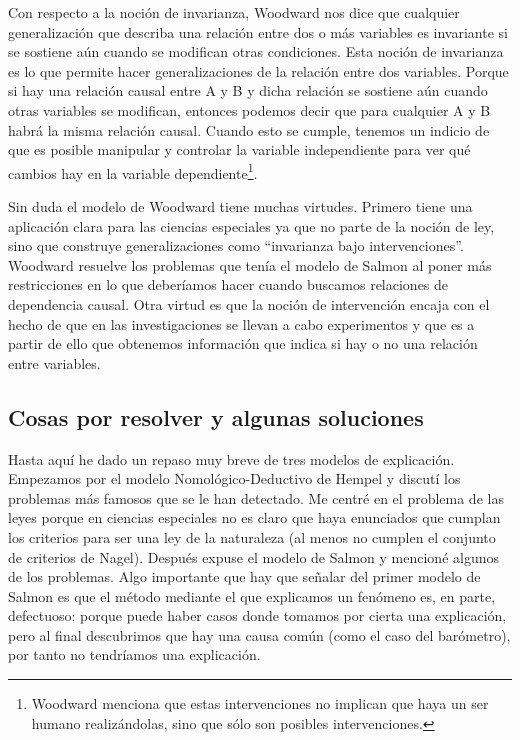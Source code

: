Con respecto a la noción de invarianza, Woodward nos dice que cualquier generalización que describa una relación entre dos o más variables es invariante si se sostiene aún cuando se modifican otras condiciones. Esta noción de invarianza es lo que permite hacer generalizaciones de la relación entre dos variables. Porque si hay una relación causal entre A y B y dicha relación se sostiene aún cuando otras variables se modifican, entonces podemos decir que para cualquier A y B habrá la misma relación causal. Cuando esto se cumple, tenemos un indicio de que es posible manipular y controlar la variable independiente para ver qué cambios hay en la variable dependiente\footnote{Woodward menciona que estas intervenciones no implican que haya un ser humano realizándolas, sino que sólo son posibles intervenciones.}\cite{Woodward2000}.

Sin duda el modelo de Woodward tiene muchas virtudes. Primero tiene una aplicación clara para las ciencias especiales ya que no parte de la noción de ley, sino que construye generalizaciones como ``invarianza bajo intervenciones''. Woodward resuelve los problemas que tenía el modelo de Salmon al poner más restricciones en lo que deberíamos hacer cuando buscamos relaciones de dependencia causal. Otra virtud es que la noción de intervención encaja con el hecho de que en las investigaciones se llevan a cabo experimentos y que es a partir de ello que obtenemos información que indica si hay o no una relación entre variables.

\subsection{Cosas por resolver y algunas soluciones}

\noindent Hasta aquí he dado un repaso muy breve de tres modelos de explicación. Empezamos por el modelo Nomológico-Deductivo de Hempel y discutí los problemas más famosos que se le han detectado. Me centré en el problema de las leyes porque en ciencias especiales no es claro que haya enunciados que cumplan los criterios para ser una ley de la naturaleza (al menos no cumplen el conjunto de criterios de Nagel). Después expuse el modelo de Salmon y mencioné algunos de los problemas. Algo importante que hay que señalar del primer modelo de Salmon es que el método mediante el que explicamos un fenómeno es, en parte, defectuoso: porque puede haber casos donde tomamos por cierta una explicación, pero al final descubrimos que hay una causa común (como el caso del barómetro), por tanto no tendríamos una explicación.

